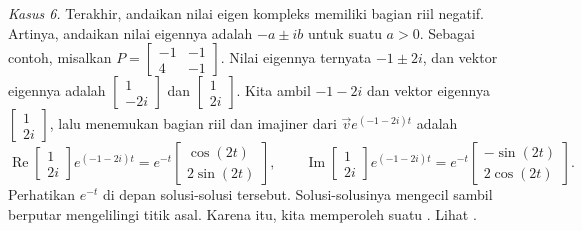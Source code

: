 \medskip

\emph{Kasus 6.} Terakhir, andaikan nilai eigen kompleks memiliki bagian riil
negatif.  Artinya, andaikan nilai eigennya adalah $-a \pm ib$ untuk suatu $a > 0$.
Sebagai contoh, misalkan $P = 
\left[ \begin{smallmatrix} -1 & -1 \\ 4 & -1 \end{smallmatrix} \right]$.
Nilai eigennya ternyata $-1\pm 2i$, dan vektor eigennya adalah
$\left[ \begin{smallmatrix} 1 \\ -2i \end{smallmatrix} \right]$ dan
$\left[ \begin{smallmatrix} 1 \\ 2i \end{smallmatrix} \right]$.  Kita ambil
$-1 - 2i$ dan vektor eigennya
$\left[ \begin{smallmatrix} 1 \\ 2i \end{smallmatrix} \right]$, lalu menemukan
bagian riil dan imajiner dari
$\vec{v} e^{(-1-2i)t}$ adalah
\begin{equation*}
\operatorname{Re}
\begin{bmatrix} 1 \\ 2i \end{bmatrix} e^{(-1-2i)t} =
e^{-t}
\begin{bmatrix} \cos (2t) \\ 2 \sin (2t)  \end{bmatrix} ,
\qquad
\operatorname{Im}
\begin{bmatrix} 1 \\ 2i \end{bmatrix} e^{(-1-2i)t} =
e^{-t}
\begin{bmatrix} -\sin (2t) \\ 2 \cos (2t) \end{bmatrix} .
\end{equation*}
Perhatikan $e^{-t}$ di depan solusi-solusi tersebut.  Solusi-solusinya
mengecil sambil berputar mengelilingi titik asal.  Karena itu, kita memperoleh
suatu \emph{}.
Lihat .

\begin{myfig}
\capstart
{}
\caption{Contoh medan vektor serapan spiral.\label{pln:spiral-sinkfig}}
\end{myfig}


